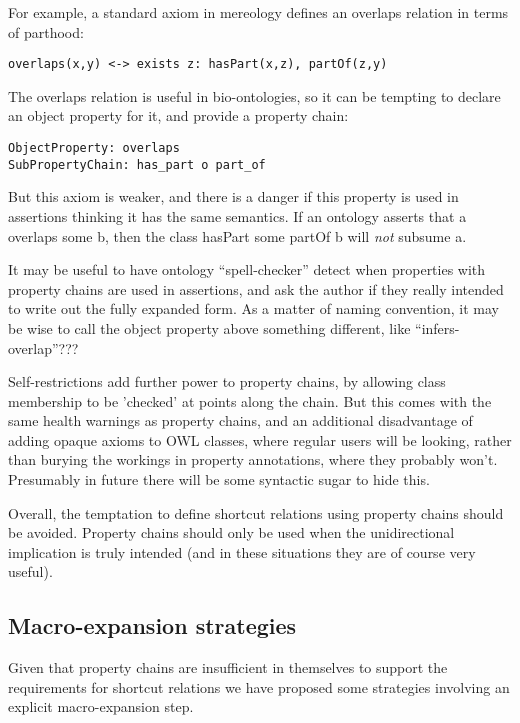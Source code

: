 \documentclass[11pt]{article}
\begin{document}
For example, a standard axiom in mereology\cite{Bittner} defines an
overlaps relation in terms of parthood:

\begin{verbatim}
overlaps(x,y) <-> exists z: hasPart(x,z), partOf(z,y)
\end{verbatim}

The overlaps relation is useful in bio-ontologies\cite{who}, so it can
be tempting to declare an object property for it, and provide a
property chain:

\begin{verbatim}
ObjectProperty: overlaps
SubPropertyChain: has_part o part_of
\end{verbatim}

But this axiom is weaker, and there is a danger if this property is
used in assertions thinking it has the same semantics. If an ontology
asserts that a overlaps some b, then the class hasPart some partOf b will
\emph{not} subsume a.

It may be useful to have ontology ``spell-checker'' detect when
properties with property chains are used in assertions, and ask the
author if they really intended to write out the fully expanded
form. As a matter of naming convention, it may be wise to call the
object property above something different, like ``infers-overlap''???

Self-restrictions add further power to property chains, by allowing
class membership to be 'checked' at points along the chain. But this
comes with the same health warnings as property chains, and an
additional disadvantage of adding opaque axioms to OWL classes, where
regular users will be looking, rather than burying the workings in
property annotations, where they probably won't. Presumably in future
there will be some syntactic sugar to hide this.

Overall, the temptation to define shortcut relations using property
chains should be avoided. Property chains should only be used when the
unidirectional implication is truly intended (and in these situations
they are of course very useful).

\subsection{Macro-expansion strategies}

Given that property chains are insufficient in themselves to support
the requirements for shortcut relations we have proposed some
strategies involving an explicit macro-expansion step.
\end{document}
